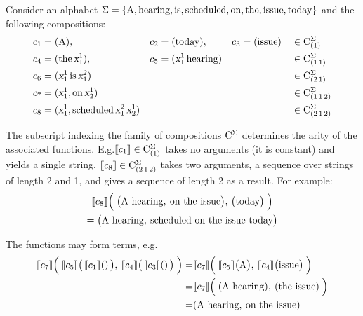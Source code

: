 \documentclass[../document.tex]{subfiles}
\begin{document}
    \begin{example}\label{ex:lcfrs:comp}
       Consider an alphabet \(\Sigma=\{\text{A}, \text{hearing}, \text{is}, \text{scheduled}, \text{on}, \text{the}, \text{issue}, \text{today}\}\) and the following compositions:
        \begin{align*}
            c_1 &= (\text{A}), & c_2 &= (\text{today}), & c_3 &= (\text{issue}) && \in \mathrm{C}^\Sigma_{(1)} \\
            c_4 &= (\text{the} \, \textsl{x}_1^1), & c_5 &= (\textsl{x}_1^1 \, \text{hearing}) & & && \in \mathrm{C}^\Sigma_{(1\,1)} \\
            c_6 &= (\textsl{x}_1^1 \, \text{is} \, \textsl{x}_1^2) && && && \in \mathrm{C}^\Sigma_{(2\,1)} \\
            c_7 &= (\textsl{x}_1^1, \text{on} \, \textsl{x}_2^1) && && && \in \mathrm{C}^\Sigma_{(1\,1\,2)}   \\
            c_8 &= (\textsl{x}_1^1, \text{scheduled} \, \textsl{x}_1^2 \, \textsl{x}_2^1) && && && \in \mathrm{C}^\Sigma_{(2\,1\,2)}
        \end{align*}

        The subscript indexing the family of compositions \(\mathrm{C}^\Sigma\) determines the arity of the associated functions.
        E.g.\@ \(\llbracket c_1\rrbracket \in \mathrm{C}^\Sigma_{(1)}\) takes no arguments (it is constant) and yields a single string,
            \(\llbracket c_8\rrbracket \in \mathrm{C}^\Sigma_{(2\,1\,2)}\) takes two arguments, a sequence over strings of length 2 and 1, and gives a sequence of length 2 as a result.
        For example:
        \begin{multline*}
            \llbracket c_8\rrbracket\Big( \; \big( \text{A hearing}, \: \text{on the issue} \big), \, \big( \text{today} \big) \; \Big)
            \\= \big( \text{A hearing}, \: \text{scheduled on the issue today} \big)
        \end{multline*}

        The functions may form terms, e.g.
        \begin{align*}
            \llbracket c_7\rrbracket\Big( \; \llbracket c_5\rrbracket\big(\,\llbracket c_1\rrbracket()\,\big), \: \llbracket c_4\rrbracket\big(\,\llbracket c_3\rrbracket()\,\big) \; \Big)
                =& \llbracket c_7\rrbracket\Big( \; \llbracket c_5\rrbracket\big(\text{A}\big), \: \llbracket c_4\rrbracket\big(\text{issue}\big) \; \Big) \\
                =& \llbracket c_7\rrbracket\Big( \; (\text{A hearing}), \: (\text{the issue}) \; \Big) \\
                =& (\text{A hearing}, \: \text{on the issue})
        \end{align*}
    \end{example}
\end{document}
